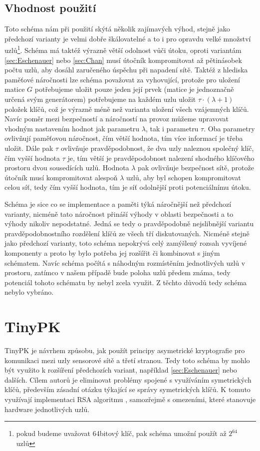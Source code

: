 \documentclass[11pt,final,twoside]{fithesis2}
\begin{document}
\subsection{Vhodnost použití}
Toto schéma nám při použití skýtá několik zajímavých výhod, stejně jako předchozí varianty je velmi dobře škálovatelné a to i pro opravdu velké množství uzlů\footnote{pokud budeme uvažovat 64bitový klíč, 
pak schéma umožní použít až $2^{64}$ uzlů}. Schéma má taktéž výrazně větší odolnost vůči útoku, oproti variantám \ref{sec:Eschenauer} nebo \ref{sec:Chan} musí útočník kompromitovat až pětinásobek počtu uzlů, 
aby dosáhl zaručeného úspěchu při napadení sítě. Taktéž z hlediska paměťové náročnosti lze schéma považovat za vyhovující, protože pro uložení matice $G$ potřebujeme uložit pouze jeden její prvek 
(matice je jednoznačně určená svým generátorem) potřebujeme na každém uzlu uložit $\tau \cdot (\lambda +1)$ položek klíčů, což je výrazně méně než varianta uložení všech vzájemných klíčů. Navíc 
poměr mezi bezpečností a náročností na provoz můžeme upravovat vhodným nastavením hodnot jak parametru $\lambda$, tak i parametru $\tau$. Oba parametry ovlivňují paměťovou náročnost, čím větší hodnota, tím 
více informací je třeba uložit. Dále pak $\tau$ ovlivňuje pravděpodobnost, že dva uzly naleznou společný klíč, čím vyšší hodnota $\tau$ je, tím větší je pravděpodobnost nalezení shodného klíčového prostoru
dvou sousedících uzlů. Hodnota $\lambda$ pak ovlivňuje bezpečnost sítě, protože útočník musí kompromitovat alespoň $\lambda$ uzlů, aby byl schopen kompromitovat celou síť, tedy čím vyšší hodnota, tím 
je síť odolnější proti potenciálnímu útoku.

Schéma je sice co se implementace a paměti týká náročnější než předchozí varianty, nicméně tato náročnost přináší výhody v oblasti bezpečnosti a to výhody nikoliv 
nepodstatné. Jedná se tedy o pravděpodobně nejslibnější variantu pravděpodobnostního rozdělení klíčů ze všech tří diskutovaných. Nicméně stejně jako předchozí varianty, toto schéma nepokrývá celý 
zamýšlený rozsah vyvíjené komponenty a proto by bylo potřeba jej rozšířit či kombinovat s jiným schématem. Navíc schéma počítá s náhodným rozmístěním jednotlivých uzlů v prostoru, zatímco v našem případě 
bude poloha uzlů předem známa, tedy potenciál tohoto schématu by nebyl zcela využit. Z těchto důvodů tedy schéma nebylo vybráno.

\section{TinyPK}
TinyPK \cite{Watro2004} je návrhem způsobu, jak použít principy asymetrické kryptografie 
pro komunikaci mezi uzly sensorové sítě a třetí stranou. Tedy toto schéma by mohlo být využito k rozšíření předchozích variant, například \ref{sec:Eschenauer}
nebo dalších. Cílem autorů je eliminovat problémy spojené s využíváním 
symetrických klíčů, především zásadní otázku týkající se správy symetrických klíčů. K tomuto využívají
implementaci RSA algoritmu \cite{Rivest1978}, samozřejmě s omezeními, které stanovuje hardware jednotlivých uzlů.
\end{document}
